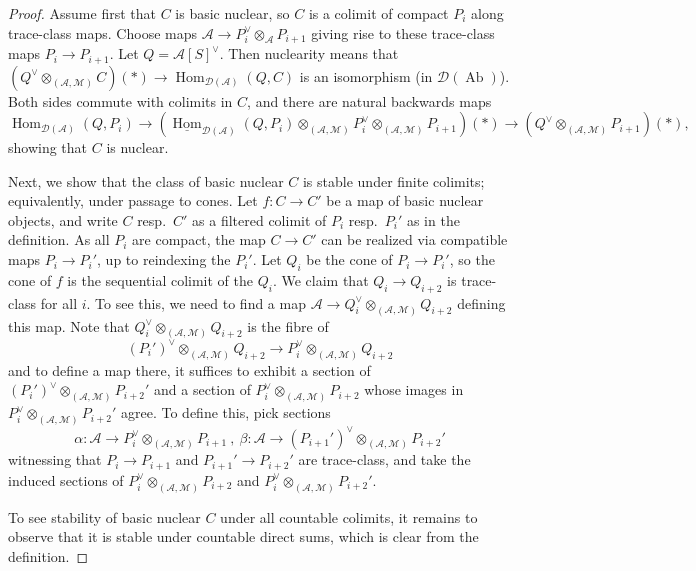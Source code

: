 \documentclass[11pt]{amsbook}
\DeclareMathOperator{\Hom}{Hom}
\newcommand{\intHom}{\underline{\Hom}}
\DeclareMathOperator{\Ab}{Ab}
\numberwithin{equation}{section}
\numberwithin{theorem}{section}
\theoremstyle{definition}
\begin{document}
\begin{proof} Assume first that $C$ is basic nuclear, so $C$ is a colimit of compact $P_i$ along trace-class maps. Choose maps $\mathcal A\to P_i^\vee\otimes_{\mathcal A} P_{i+1}$ giving rise to these trace-class maps $P_i\to P_{i+1}$. Let $Q=\mathcal A[S]^\vee$. Then nuclearity means that $(Q^\vee\otimes_{(\mathcal A,\mathcal M)} C)(\ast)\to \Hom_{\mathcal D(\mathcal A)}(Q,C)$ is an isomorphism (in $\mathcal D(\Ab)$). Both sides commute with colimits in $C$, and there are natural backwards maps
\[
\Hom_{\mathcal D(\mathcal A)}(Q,P_i)\to (\intHom_{\mathcal D(\mathcal A)}(Q,P_i)\otimes_{(\mathcal A,\mathcal M)} P_i^\vee\otimes_{(\mathcal A,\mathcal M)} P_{i+1})(\ast)\to (Q^\vee\otimes_{(\mathcal A,\mathcal M)} P_{i+1})(\ast),
\]
showing that $C$ is nuclear.

Next, we show that the class of basic nuclear $C$ is stable under finite colimits; equivalently, under passage to cones. Let $f: C\to C'$ be a map of basic nuclear objects, and write $C$ resp.~$C'$ as a filtered colimit of $P_i$ resp.~$P_i'$ as in the definition. As all $P_i$ are compact, the map $C\to C'$ can be realized via compatible maps $P_i\to P_i'$, up to reindexing the $P_i'$. Let $Q_i$ be the cone of $P_i\to P_i'$, so the cone of $f$ is the sequential colimit of the $Q_i$. We claim that $Q_i\to Q_{i+2}$ is trace-class for all $i$. To see this, we need to find a map $\mathcal A\to Q_i^\vee\otimes_{(\mathcal A,\mathcal M)} Q_{i+2}$ defining this map. Note that $Q_i^\vee\otimes_{(\mathcal A,\mathcal M)} Q_{i+2}$ is the fibre of
\[
(P_i')^\vee\otimes_{(\mathcal A,\mathcal M)} Q_{i+2}\to P_i^\vee\otimes_{(\mathcal A,\mathcal M)} Q_{i+2}
\]
and to define a map there, it suffices to exhibit a section of $(P_i')^\vee\otimes_{(\mathcal A,\mathcal M)} P_{i+2}'$ and a section of $P_i^\vee\otimes_{(\mathcal A,\mathcal M)} P_{i+2}$ whose images in $P_i^\vee\otimes_{(\mathcal A,\mathcal M)} P_{i+2}'$ agree. To define this, pick sections
\[
\alpha: \mathcal A\to P_i^\vee\otimes_{(\mathcal A,\mathcal M)} P_{i+1}\ ,\ \beta: \mathcal A\to (P_{i+1}')^\vee\otimes_{(\mathcal A,\mathcal M)} P_{i+2}'
\]
witnessing that $P_i\to P_{i+1}$ and $P_{i+1}'\to P_{i+2}'$ are trace-class, and take the induced sections of $P_i^\vee\otimes_{(\mathcal A,\mathcal M)} P_{i+2}$ and $P_i^\vee\otimes_{(\mathcal A,\mathcal M)} P_{i+2}'$.

To see stability of basic nuclear $C$ under all countable colimits, it remains to observe that it is stable under countable direct sums, which is clear from the definition.


\end{proof}
\end{document}
